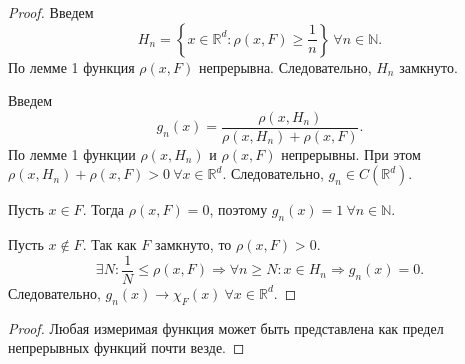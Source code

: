 \documentclass[12pt,a4paper]{report}
\begin{document}

\begin{proof}
    Введем
    \[
    H_n=\left\{x\in\mathbb R^d\colon \rho(x,F)\geq\frac{1}{n}\right\} \ \forall n\in\mathbb N.
    \]
    По лемме 1 функция $\rho(x,F)$ непрерывна. Следовательно, $H_n$ замкнуто.

    Введем
    \[
    g_n(x)=\frac{\rho(x,H_n)}{\rho(x,H_n)+\rho(x,F)}.
    \]
    По лемме 1 функции $\rho(x,H_n)$ и $\rho(x,F)$ непрерывны. При этом $\rho(x,H_n)+\rho(x,F)>0 \ \forall x\in\mathbb R^d$. Следовательно, $g_n\in C(\mathbb R^d)$.

    Пусть $x\in F$. Тогда $\rho(x,F)=0$, поэтому $g_n(x)=1 \ \forall n\in\mathbb N$.
    
    Пусть $x\notin F$. Так как $F$ замкнуто, то $\rho(x,F)>0$. 
    \[
    \exists N\colon \frac{1}{N}\leq\rho(x,F)\Rightarrow \forall n\geq N\colon x\in H_n\Rightarrow g_n(x)=0.
    \]
    Следовательно, $g_n(x)\to\chi_F(x)\ \forall x\in\mathbb R^d$.
\end{proof}


\begin{proof}
    Любая измеримая функция может быть представлена как предел непрерывных функций почти везде.
\end{proof}
\end{document}
